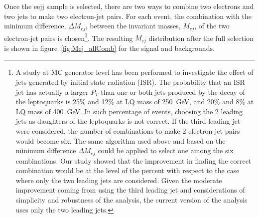 %
Once the eejj sample is selected, there are two ways to combine two electrons and two jets to make two electron-jet pairs. 
For each event, the combination with the minimum difference, $\Delta M_{ej}$, between the invariant masses, $M_{ej}$, 
of the two electron-jet pairs is chosen\footnote{
A study at MC generator level has been performed to investigate the effect of jets generated by initial state 
radiation (ISR). The probability that an ISR jet has actually a larger $P_T$ than one or both jets produced 
by the decay of the leptoquarks is 25\% and 12\% at LQ mass of 250~GeV, and 20\% and 8\% at LQ mass of 400~GeV. 
In such percentage of events, choosing the 2 leading jets as daughters of the leptoquarks is not correct. 
If the third leading jet were considered, the number of combinations to make 2 electron-jet pairs would become six.
The same algorithm used above and based on the minimum difference $\Delta M_{ej}$ could be applied to select one 
among the six combinations. Our study showed that the improvement in finding the correct combination would be at the level
of the percent with respect to the case where only the two leading jets are considered.
Given the moderate improvement coming from using the third leading jet and considerations of simplicity and robustness
of the analysis, the current version of the analysis uses only the two leading jets.
}. 
The resulting $M_{ej}$ distribution after the full selection is shown in figure~\ref{fig:Mej_allComb} for the signal and backgrounds. 

